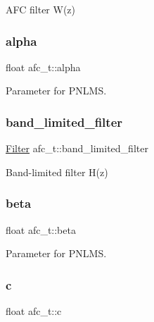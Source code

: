 A\+FC filter W(z) 

\mbox{\label{structafc__t_a161775274c257b1d804c61b77cfbbbd7}} 
\subsubsection{\texorpdfstring{alpha}{alpha}}
{\footnotesize\ttfamily float afc\+\_\+t\+::alpha}



Parameter for P\+N\+L\+MS. 

\mbox{\label{structafc__t_ad649e5413644e0dd06b2dfe789dd0630}} 
\subsubsection{\texorpdfstring{band\+\_\+limited\+\_\+filter}{band\_limited\_filter}}
{\footnotesize\ttfamily \mbox{\hyperlink{filter_8h_a69e34b8aa259d2ca0b81b5c95f395bdf}{Filter}} afc\+\_\+t\+::band\+\_\+limited\+\_\+filter}



Band-\/limited filter H(z) 

\mbox{\label{structafc__t_a829042affbb45e80df502fc95134b673}} 
\subsubsection{\texorpdfstring{beta}{beta}}
{\footnotesize\ttfamily float afc\+\_\+t\+::beta}



Parameter for P\+N\+L\+MS. 

\mbox{\label{structafc__t_a7f14ee40f9a80693b671c16c526cf846}} 
\subsubsection{\texorpdfstring{c}{c}}
{\footnotesize\ttfamily float afc\+\_\+t\+::c}



